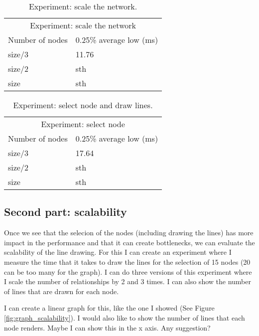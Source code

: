 \begin{table}[h!]
\centering
\begin{tabular}{ll}
\multicolumn{2}{c}{Experiment: scale the network} \\
Number of nodes   & 0.25\% average low (ms) \\
size/3 & 11.76 \\
size/2 & sth \\
size & sth \\
\end{tabular}
\caption{Experiment: scale the network.}
\label{tab:experiment_scale}
\end{table}

\begin{table}[h!]
\centering
\begin{tabular}{ll}
\multicolumn{2}{c}{Experiment: select node} \\
Number of nodes   & 0.25\% average low (ms) \\
size/3 & 17.64 \\
size/2 & sth \\
size & sth \\
\end{tabular}
\caption{Experiment: select node and draw lines.}
\label{tab:experiment_select}
\end{table}

\subsection{Second part: scalability}

Once we see that the selecion of the nodes (including drawing the lines) has more impact in the performance and that it can create bottlenecks, we can evaluate the scalability of the line drawing. For this I can create an experiment where I measure the time that it takes to draw the lines for the selection of 15 nodes (20 can be too many for the graph). I can do three versions of this experiment where I scale the number of relationships by 2 and 3 times. I can also show the number of lines that are drawn for each node.

I can create a linear graph for this, like the one I showed (See Figure \ref{fig:graph_scalability}). I would also like to show the number of lines that each node renders. Maybe I can show this in the x axis. Any suggestion?

